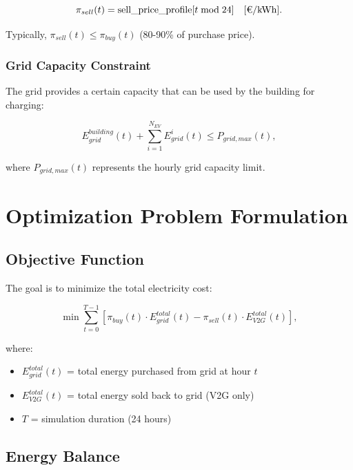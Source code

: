 \begin{equation}
\pi_{sell}(t) = \text{sell\_price\_profile}[t \bmod 24] \quad [\text{€/\text{kWh}}].
\end{equation}

Typically, $\pi_{sell}(t) \leq \pi_{buy}(t)$ (80-90\% of purchase price).

\subsubsection{Grid Capacity Constraint}

The grid provides a certain capacity that can be used by the building for charging:

\begin{equation}
E_{grid}^{building}(t) + \sum_{i=1}^{N_{EV}} E_{grid}^{i}(t) \leq P_{grid,max}(t),
\end{equation}

where $P_{grid,max}(t)$ represents the hourly grid capacity limit.

\section{Optimization Problem Formulation}
\label{sec:optimization_problem}

\subsection{Objective Function}

The goal is to minimize the total electricity cost:

\begin{equation}
\min \sum_{t=0}^{T-1} \left[ \pi_{buy}(t) \cdot E_{grid}^{total}(t) - \pi_{sell}(t) \cdot E_{V2G}^{total}(t) \right],
\label{eq:objective}
\end{equation}

where:
\begin{itemize}
    \item $E_{grid}^{total}(t)$ = total energy purchased from grid at hour $t$
    \item $E_{V2G}^{total}(t)$ = total energy sold back to grid (V2G only)
    \item $T$ = simulation duration (24 hours)
\end{itemize}

\subsection{Energy Balance}

